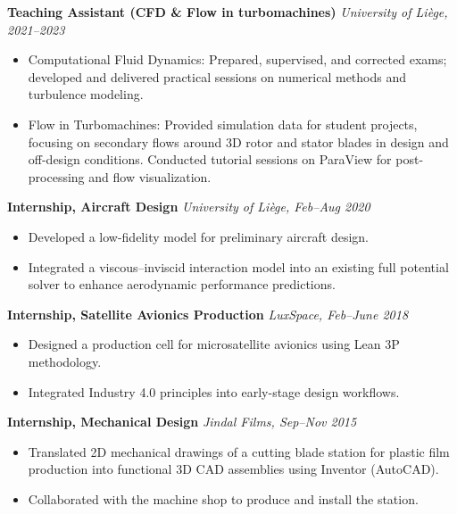 \documentclass[a4paper,10pt]{article}
\begin{document}
\textbf{Teaching Assistant (CFD \& Flow in turbomachines)} \hfill \textit{University of Liège, 2021–2023}

\begin{itemize}[leftmargin=1.5em]
  \item Computational Fluid Dynamics: Prepared, supervised, and corrected exams; developed and delivered practical sessions on numerical methods and turbulence modeling.
  \item Flow in Turbomachines: Provided simulation data for student projects, focusing on secondary flows around 3D rotor and stator blades in design and off-design conditions. Conducted tutorial sessions on ParaView for post-processing and flow visualization.
\end{itemize}

\textbf{Internship, Aircraft Design} \hfill \textit{University of Liège, Feb–Aug 2020}
\begin{itemize}[leftmargin=1.5em]
    \item Developed a low-fidelity model for preliminary aircraft design.
    \item Integrated a viscous–inviscid interaction model into an existing full potential solver to enhance aerodynamic performance predictions.
\end{itemize}

\textbf{Internship, Satellite Avionics Production} \hfill \textit{LuxSpace, Feb–June 2018}

\begin{itemize}[leftmargin=1.5em]
  \item Designed a production cell for microsatellite avionics using Lean 3P methodology.
  \item Integrated Industry 4.0 principles into early-stage design workflows.
\end{itemize}

\textbf{Internship, Mechanical Design} \hfill \textit{Jindal Films, Sep–Nov 2015}

\begin{itemize}[leftmargin=1.5em]
  \item Translated 2D mechanical drawings of a cutting blade station for plastic film production into functional 3D CAD assemblies using Inventor (AutoCAD).
  \item Collaborated with the machine shop to produce and install the station.
\end{itemize}
\end{document}
